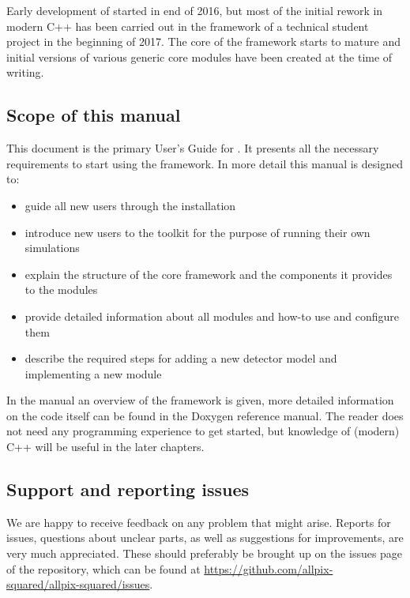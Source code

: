 Early development of \apsq started in end of 2016, but most of the initial rework in modern C++ has been carried out in the framework of a technical student project in the beginning of 2017. The core of the framework starts to mature and initial versions of various generic core modules have been created at the time of writing.

\subsection{Scope of this manual}
This document is the primary User's Guide for \apsq. It presents all the necessary requirements to start using the framework. In more detail this manual is designed to:
\begin{itemize}
\item guide all new users through the installation
\item introduce new users to the toolkit for the purpose of running their own simulations
\item explain the structure of the core framework and the components it provides to the modules
\item provide detailed information about all modules and how-to use and configure them
\item describe the required steps for adding a new detector model and implementing a new module
\end{itemize}

In the manual an overview of the framework is given, more detailed information on the code itself can be found in the Doxygen reference manual. The reader does not need any programming experience to get started, but knowledge of (modern) C++ will be useful in the later chapters.

\subsection{Support and reporting issues}
We are happy to receive feedback on any problem that might arise. Reports for issues, questions about unclear parts, as well as suggestions for improvements, are very much appreciated. These should preferably be brought up on the issues page of the repository, which can be found at \url{https://github.com/allpix-squared/allpix-squared/issues}.
